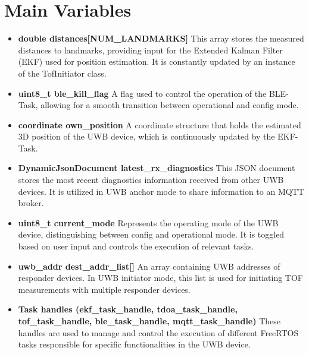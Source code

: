 \section{Main Variables}
\begin{itemize}
	\item \textbf{double distances[NUM\_LANDMARKS]}
	\newline
	This array stores the measured distances to landmarks, providing input for the Extended Kalman Filter (EKF) used for position estimation.
	It is constantly updated by an instance of the TofInitiator class. 
	
	\item \textbf{uint8\_t ble\_kill\_flag}
	\newline
	A flag used to control the operation of the BLE-Task, allowing for a smooth transition between operational and config mode.
	
	\item \textbf{coordinate own\_position}
	\newline
	A coordinate structure that holds the estimated 3D position of the UWB device, which is continuously updated by the EKF-Task. 
	
	\item \textbf{DynamicJsonDocument latest\_rx\_diagnostics}
	\newline
	This JSON document stores the most recent diagnostics information received from other UWB devices. It is utilized in UWB anchor mode to share information to an MQTT broker.
	
	\item \textbf{uint8\_t current\_mode}
	\newline
	Represents the operating mode of the UWB device, distinguishing between config and operational mode. It is toggled based on user input and controls the execution of relevant tasks.
	
	\item \textbf{uwb\_addr dest\_addr\_list[]}
	\newline
	An array containing UWB addresses of responder devices. 
	In UWB initiator mode, this list is used for initiating TOF measurements with multiple responder devices.
	
	\item \textbf{Task handles (ekf\_task\_handle, tdoa\_task\_handle, tof\_task\_handle, ble\_task\_handle, mqtt\_task\_handle)}
	\newline
	These handles are used to manage and control the execution of different FreeRTOS tasks responsible for specific functionalities in the UWB device.
\end{itemize}

